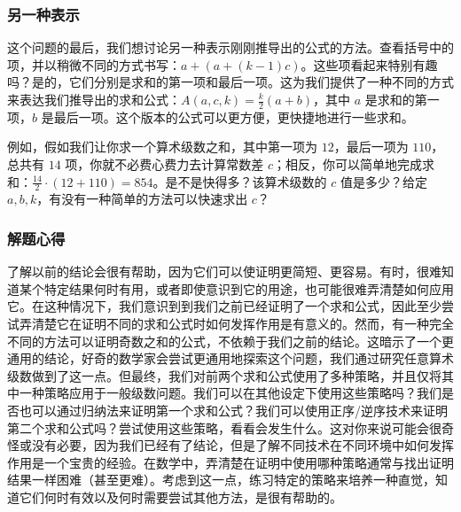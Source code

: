 \subsubsection*{另一种表示}

这个问题的最后，我们想讨论另一种表示刚刚推导出的公式的方法。查看括号中的项，并以稍微不同的方式书写：$a+ (a+ (k-1)c)$。这些项看起来特别有趣吗？是的，它们分别是求和的第一项和最后一项。这为我们提供了一种不同的方式来表达我们推导出的求和公式：$A(a, c, k) = \frac{k}{2}(a + b)$，其中 $a$ 是求和的第一项，$b$ 是最后一项。这个版本的公式可以更方便，更快捷地进行一些求和。

例如，假如我们让你求一个算术级数之和，其中第一项为 $12$，最后一项为 $110$，总共有 $14$ 项，你就不必费心费力去计算常数差 $c$；相反，你可以简单地完成求和：$\frac{14}{2} \cdot (12 + 110) = 854$。是不是快得多？该算术级数的 $c$ 值是多少？给定 $a,b,k$，有没有一种简单的方法可以快速求出 $c$？

\subsubsection*{解题心得}

了解以前的结论会很有帮助，因为它们可以使证明更简短、更容易。有时，很难知道某个特定结果何时有用，或者即使意识到它的用途，也可能很难弄清楚如何应用它。在这种情况下，我们意识到到我们之前已经证明了一个求和公式，因此至少尝试弄清楚它在证明不同的求和公式时如何发挥作用是有意义的。然而，有一种完全不同的方法可以证明奇数之和的公式，不依赖于我们之前的结论。这暗示了一个更通用的结论，好奇的数学家会尝试更通用地探索这个问题，我们通过研究任意算术级数做到了这一点。但最终，我们对前两个求和公式使用了多种策略，并且仅将其中一种策略应用于一般级数问题。我们可以在其他设定下使用这些策略吗？我们是否也可以通过归纳法来证明第一个求和公式？我们可以使用正序/逆序技术来证明第二个求和公式吗？尝试使用这些策略，看看会发生什么。这对你来说可能会很奇怪或没有必要，因为我们已经有了结论，但是了解不同技术在不同环境中如何发挥作用是一个宝贵的经验。在数学中，弄清楚在证明中使用哪种策略通常与找出证明结果一样困难（甚至更难）。考虑到这一点，练习特定的策略来培养一种直觉，知道它们何时有效以及何时需要尝试其他方法，是很有帮助的。
